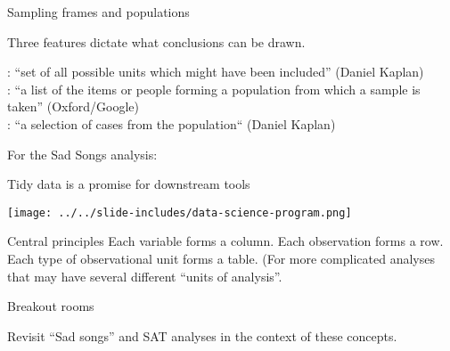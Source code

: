 \documentclass[table]{beamer}\usepackage[]{graphicx}\usepackage[]{color}
\begin{document}

\begin{frame}{Sampling frames and populations}

\begin{block}{Three features dictate what conclusions can be drawn.}

\bi
{}: ``set of all possible units which might have been included'' (Daniel Kaplan)\\
: ``a list of the items or people forming a population from which a sample is taken'' (Oxford/Google) \\
: ``a selection of cases from the population`` (Daniel Kaplan)
\ei

\end{block}

For the Sad Songs analysis:



\end{frame}



\begin{frame}[fragile]{Tidy data is a promise for downstream tools}


\begin{center}
\texttt{[image: ../../slide-includes/data-science-program.png]}
\end{center}

\vspace{2em}

\begin{block}{Central principles}
\bi
	\myitem Each variable forms a column.
	\myitem Each observation forms a row.
	\myitem Each type of observational unit forms a table. (For more complicated analyses that may have several different ``units of analysis''.
\ei
\end{block}



\end{frame}



\begin{frame}[fragile]{Breakout rooms}


\begin{block}{Revisit ``Sad songs'' and SAT analyses in the context of these concepts.}
\end{block}

\end{frame}
\end{document}
